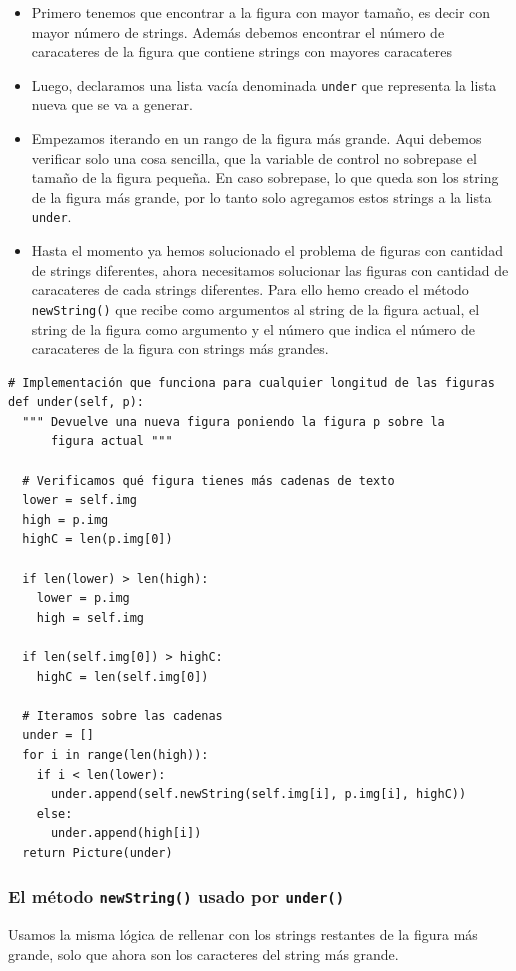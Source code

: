 \documentclass[10pt, a4paper]{article}
\newcommand{\mintpython}[1]{\texttt{#1}}
\begin{document}
\begin{itemize}
  \item Primero tenemos que encontrar a la figura con mayor tamaño, es decir con mayor número de strings. Además debemos encontrar el número de caracateres de la figura que contiene strings con mayores caracateres
  \item Luego, declaramos una lista vacía denominada \mintpython{under} que representa la lista nueva que se va a generar.
  \item Empezamos iterando en un rango de la figura más grande. Aqui debemos verificar solo una cosa sencilla, que la variable de control no sobrepase el tamaño de la figura pequeña. En caso sobrepase, lo que queda son los string de la figura más grande, por lo tanto solo agregamos estos strings a la lista \mintpython{under}.
  \item Hasta el momento ya hemos solucionado el problema de figuras con cantidad de strings diferentes, ahora necesitamos solucionar las figuras con cantidad de caracateres de cada strings diferentes. Para ello hemo creado el método \mintpython{newString()} que recibe como argumentos al string de la figura actual, el string de la figura como argumento y el número que indica el número de caracateres de la figura con strings más grandes.
\end{itemize}

\begin{verbatim}
# Implementación que funciona para cualquier longitud de las figuras
def under(self, p):
  """ Devuelve una nueva figura poniendo la figura p sobre la
      figura actual """

  # Verificamos qué figura tienes más cadenas de texto
  lower = self.img
  high = p.img
  highC = len(p.img[0]) 

  if len(lower) > len(high):
    lower = p.img
    high = self.img

  if len(self.img[0]) > highC:
    highC = len(self.img[0])

  # Iteramos sobre las cadenas
  under = []
  for i in range(len(high)):
    if i < len(lower):
      under.append(self.newString(self.img[i], p.img[i], highC))
    else:
      under.append(high[i])
  return Picture(under)
\end{verbatim}

\subsubsection{El método \mintpython{newString()} usado por \mintpython{under()}}
Usamos la misma lógica de rellenar con los strings restantes de la figura más grande, solo que ahora son los caracteres del string más grande.
\end{document}
